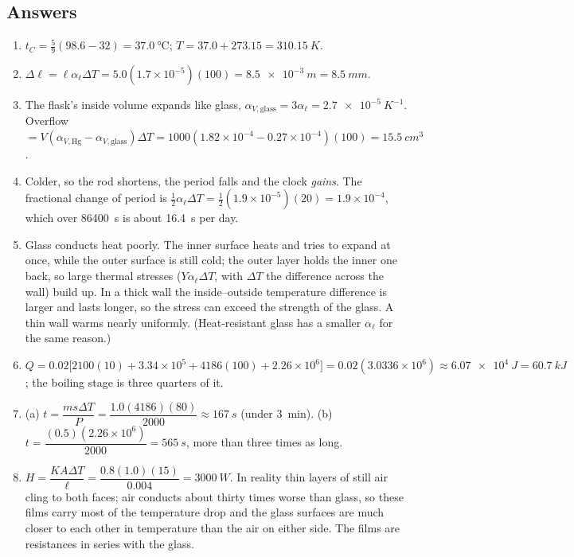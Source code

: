 \subsection*{Answers}
{\small
\begin{enumerate}[itemsep=2pt]
\item $t_C=\tfrac59(98.6-32)=\SI{37.0}{\celsius}$; $T=37.0+273.15=\SI{310.15}{K}$.
\item $\Delta\ell=\ell\alpha_\ell\Delta T=5.0(1.7\times10^{-5})(100)=\SI{8.5e-3}{m}=\SI{8.5}{mm}$.
\item The flask's inside volume expands like glass, $\alpha_{V,\text{glass}}=3\alpha_\ell=\SI{2.7e-5}{K^{-1}}$.
      Overflow $=V(\alpha_{V,\text{Hg}}-\alpha_{V,\text{glass}})\Delta T
      =1000(1.82\times10^{-4}-0.27\times10^{-4})(100)=\SI{15.5}{cm^3}$.
\item Colder, so the rod shortens, the period falls and the clock \emph{gains}. The fractional change
      of period is $\tfrac12\alpha_\ell\Delta T=\tfrac12(1.9\times10^{-5})(20)=1.9\times10^{-4}$, which
      over \SI{86400}{s} is about \SI{16.4}{s} per day.
\item Glass conducts heat poorly. The inner surface heats and tries to expand at once, while the outer
      surface is still cold; the outer layer holds the inner one back, so large thermal stresses
      ($Y\alpha_\ell\Delta T$, with $\Delta T$ the difference across the wall) build up. In a thick
      wall the inside--outside temperature difference is larger and lasts longer, so the stress can exceed
      the strength of the glass. A thin wall warms nearly uniformly. (Heat-resistant glass has a
      smaller $\alpha_\ell$ for the same reason.)
\item $Q=0.02\bigl[2100(10)+3.34\times10^5+4186(100)+2.26\times10^6\bigr]=0.02(3.0336\times10^6)
      \approx\SI{6.07e4}{J}=\SI{60.7}{kJ}$; the boiling stage is three quarters of it.
\item (a) $t=\dfrac{ms\Delta T}{P}=\dfrac{1.0(4186)(80)}{2000}\approx\SI{167}{s}$ (under
      \SI{3}{min}). (b) $t=\dfrac{(0.5)(2.26\times10^6)}{2000}=\SI{565}{s}$, more than three times as
      long.
\item $H=\dfrac{KA\Delta T}{\ell}=\dfrac{0.8(1.0)(15)}{0.004}=\SI{3000}{W}$. In reality thin layers of
      still air cling to both faces; air conducts about thirty times worse than glass, so these films
      carry most of the temperature drop and the glass surfaces are much closer to each other in
      temperature than the air on either side. The films are resistances in series with the glass.

\end{enumerate}}
